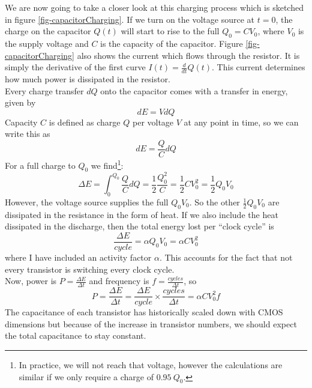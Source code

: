 \documentclass[12pt,a4paper]{article} %
\begin{document}
We are now going to take a closer look at this charging process which is sketched in figure \ref{fig-capacitorCharging}. If we turn on the voltage source at $t=0$, the charge on the capacitor $Q(t)$ will start to rise to the full $Q_0 = CV_0$, where $V_0$ is the supply voltage and $C$ is the capacity of the capacitor. Figure \ref{fig-capacitorCharging} also shows the current which flows through the resistor. It is simply the derivative of the first curve $I(t)= \frac{d}{dt}Q(t)$. This current determines how much power is dissipated in the resistor.\\ 
Every charge transfer $dQ$ onto the capacitor comes with a transfer in energy, given by
\begin{equation}
	dE = VdQ
\end{equation}
Capacity $C$ is defined as charge $Q$ per voltage $V$ at any point in time, so we can write this as
\begin{equation}
	dE = \frac{Q}{C} dQ
\end{equation}
For a full charge to $Q_0$ we find\footnote{In practice, we will not reach that voltage, however the calculations are similar if we only require a charge of $\SI{0.95}{Q_0}$.}:
\begin{equation}
	\Delta E = \int_{0}^{Q_0} \frac{Q}{C} dQ = \frac{1}{2} \frac{Q_0^2}{C} = \frac{1}{2} C V_0^2 = \frac{1}{2} Q_0 V_0
\end{equation}
However, the voltage source supplies the full $Q_0 V_0$. So the other $\frac{1}{2}Q_0 V_0$ are dissipated in the resistance in the form of heat. If we also include the heat dissipated in the discharge, then the total energy lost per ``clock cycle'' is
\begin{equation}
	\frac{\Delta E}{cycle} = \alpha Q_0 V_0 = \alpha C V_0^2
\end{equation}
where I have included an activity factor $\alpha$. This accounts for the fact that not every transistor is switching every clock cycle.\\ 
Now, power is $P=\frac{\Delta E}{\Delta t}$ and frequency is $f=\frac{cycles}{\Delta t}$, so
\begin{equation}
	P = \frac{\Delta E}{\Delta t} = \frac{\Delta E}{cycle} \times \frac{cycles}{\Delta t} = \alpha CV_0^2f \label{eq-power}
\end{equation}
The capacitance of each transistor has historically scaled down with CMOS dimensions \cite{dennardScaling} but because of the increase in transistor numbers, we should expect the total capacitance to stay constant. \\
\end{document}
